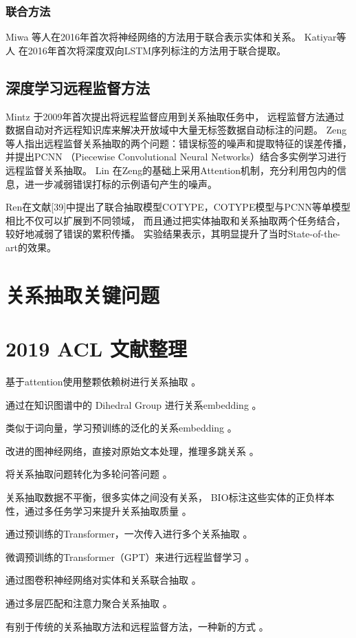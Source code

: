 \documentclass[UTF8,12pt]{ctexart}
\begin{document}
    \subsubsection{联合方法}
    Miwa \cite{miwa2016end} 等人在2016年首次将神经网络的方法用于联合表示实体和关系。
    Katiyar等人 \cite{katiyar2017going} 在2016年首次将深度双向LSTM序列标注的方法用于联合提取。
    
    \subsection{深度学习远程监督方法}
    Mintz \cite{mintz2009distant} 于2009年首次提出将远程监督应用到关系抽取任务中，
    远程监督方法通过数据自动对齐远程知识库来解决开放域中大量无标签数据自动标注的问题。
    Zeng等人指出远程监督关系抽取的两个问题：错误标签的噪声和提取特征的误差传播，
    并提出PCNN \cite{zeng-etal-2015-distant} （Piecewise Convolutional Neural Networks）结合多实例学习进行远程监督关系抽取。
    Lin \cite{lin2016neural} 在Zeng的基础上采用Attention机制，充分利用包内的信息，进一步减弱错误打标的示例语句产生的噪声。

    Ren在文献[39]中提出了联合抽取模型COTYPE，COTYPE模型与PCNN等单模型相比不仅可以扩展到不同领域，
    而且通过把实体抽取和关系抽取两个任务结合，较好地减弱了错误的累积传播。
    实验结果表示，其明显提升了当时State-of-the-art的效果。

    \newpage    
    \section{关系抽取关键问题}


    \newpage
    \section{2019 ACL 文献整理}
    基于attention使用整颗依赖树进行关系抽取 \cite{guo2019attention}。

    通过在知识图谱中的 Dihedral Group 进行关系embedding \cite{xu2019relation}。
    
    类似于词向量，学习预训练的泛化的关系embedding \cite{chen2019global}。

    改进的图神经网络，直接对原始文本处理，推理多跳关系 \cite{zhu2019graph}。
    
    将关系抽取问题转化为多轮问答问题 \cite{li2019entity}。

    关系抽取数据不平衡，很多实体之间没有关系，
    BIO标注这些实体的正负样本性，通过多任务学习来提升关系抽取质量 \cite{ye2019exploiting}。
    
    通过预训练的Transformer，一次传入进行多个关系抽取 \cite{wang2019extracting}。
    
    微调预训练的Transformer（GPT）来进行远程监督学习 \cite{alt2019fine}。
    
    通过图卷积神经网络对实体和关系联合抽取 \cite{fugraphrel}。

    通过多层匹配和注意力聚合关系抽取 \cite{ye2019multi}。

    有别于传统的关系抽取方法和远程监督方法，一种新的方式 \cite{soares2019matching}。

    \newpage
    
    
\end{document}
